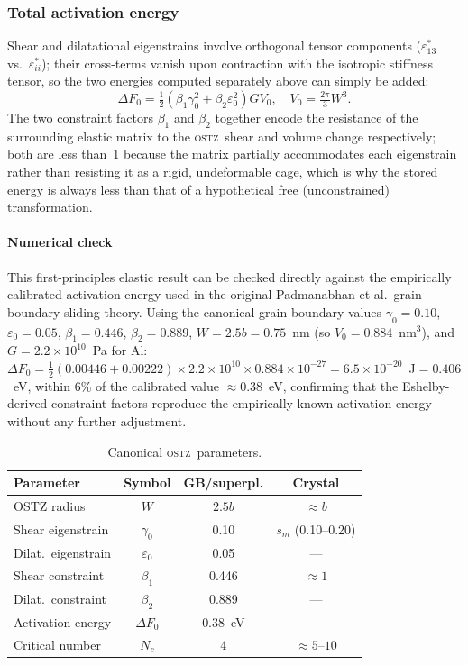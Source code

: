 \documentclass[3p]{elsarticle}
\newcommand{\OSTZ}{\textsc{ostz}}
\newcommand{\dF}{\Delta F_0}
\newcommand{\gz}{\gamma_0}
\newcommand{\half}{\tfrac{1}{2}}
\begin{document}
\subsubsection{Total activation energy}

Shear and dilatational eigenstrains involve orthogonal tensor
components ($\varepsilon^*_{13}$ vs.\ $\varepsilon^*_{ii}$);
their cross-terms vanish upon contraction with the isotropic stiffness
tensor, so the two energies computed separately above can simply be
added:
\begin{equation}
  \boxed{\dF=\half(\beta_1\gz^2+\beta_2\varepsilon_0^2)GV_0,\quad
  V_0=\tfrac{2\pi}{3}W^3.}
  \label{eq:dF0}
\end{equation}
The two constraint factors $\beta_1$ and $\beta_2$ together encode
the resistance of the surrounding elastic matrix to the \OSTZ\ shear
and volume change respectively; both are less than~1 because the
matrix partially accommodates each eigenstrain rather than resisting
it as a rigid, undeformable cage, which is why the stored energy is
always less than that of a hypothetical free (unconstrained)
transformation.

\paragraph{Numerical check} This first-principles elastic result can
be checked directly against the empirically calibrated activation
energy used in the original Padmanabhan et al.\ grain-boundary
sliding theory. Using the canonical grain-boundary values
$\gz=0.10$, $\varepsilon_0=0.05$, $\beta_1=0.446$, $\beta_2=0.889$,
$W=2.5b=0.75$~nm (so $V_0=0.884$~nm$^3$), and $G=2.2\times10^{10}$~Pa
for Al:
$\dF=\half(0.00446+0.00222)\times2.2\times10^{10}\times0.884\times10^{-27}
=6.5\times10^{-20}$~J$=0.406$~eV, within 6\% of the calibrated value
$\approx0.38$~eV, confirming that the Eshelby-derived constraint
factors reproduce the empirically known activation energy without
any further adjustment.

\begin{table}[htbp]
\centering
\small
\caption{Canonical \OSTZ\ parameters.}
\label{tab:canonical}
\begin{tabular}{lccc}
\toprule
Parameter & Symbol & GB/superpl. & Crystal\\
\midrule
OSTZ radius & $W$ & $2.5b$ & $\approx b$\\
Shear eigenstrain & $\gz$ & 0.10 & $s_m$ (0.10--0.20)\\
Dilat.\ eigenstrain & $\varepsilon_0$ & 0.05 & ---\\
Shear constraint & $\beta_1$ & 0.446 & $\approx1$\\
Dilat.\ constraint & $\beta_2$ & 0.889 & ---\\
Activation energy & $\dF$ & 0.38~eV & ---\\
Critical number & $N_c$ & 4 & $\approx5$--$10$\\
\bottomrule
\end{tabular}
\end{table}
\end{document}
